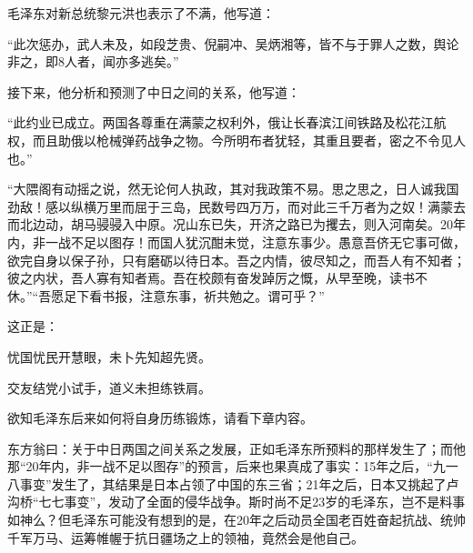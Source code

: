 \documentclass[../../dazhuan.tex]{subfiles}
\begin{document}
毛泽东对新总统黎元洪也表示了不满，他写道：

“此次惩办，武人未及，如段芝贵、倪嗣冲、吴炳湘等，皆不与于罪人之数，舆论非之，即8人者，闻亦多逃矣。”

接下来，他分析和预测了中日之间的关系，他写道：

“此约业已成立。两国各尊重在满蒙之权利外，俄让长春滨江间铁路及松花江航权，而且助俄以枪械弹药战争之物。今所明布者犹轻，其重且要者，密之不令见人也。”

“大隈阁有动摇之说，然无论何人执政，其对我政策不易。思之思之，日人诚我国劲敌！感以纵横万里而屈于三岛，民数号四万万，而对此三千万者为之奴！满蒙去而北边动，胡马骎骎入中原。况山东已失，开济之路已为攫去，则入河南矣。20年内，非一战不足以图存！而国人犹沉酣未觉，注意东事少。愚意吾侪无它事可做，欲完自身以保子孙，只有磨砺以待日本。吾之内情，彼尽知之，而吾人有不知者；彼之内状，吾人寡有知者焉。吾在校颇有奋发踔厉之慨，从早至晚，读书不休。”“吾愿足下看书报，注意东事，祈共勉之。谓可乎？”

这正是：\begin{xemph}忧国忧民开慧眼，未卜先知超先贤。\end{xemph}


交友结党小试手，道义未担练铁肩。

欲知毛泽东后来如何将自身历练锻炼，请看下章内容。

东方翁曰：关于中日两国之间关系之发展，正如毛泽东所预料的那样发生了；而他那“20年内，非一战不足以图存”的预言，后来也果真成了事实：15年之后，“九一八事变”发生了，其结果是日本占领了中国的东三省；21年之后，日本又挑起了卢沟桥“七七事变”，发动了全面的侵华战争。斯时尚不足23岁的毛泽东，岂不是料事如神么？但毛泽东可能没有想到的是，在20年之后动员全国老百姓奋起抗战、统帅千军万马、运筹帷幄于抗日疆场之上的领袖，竟然会是他自己。
\end{document}
